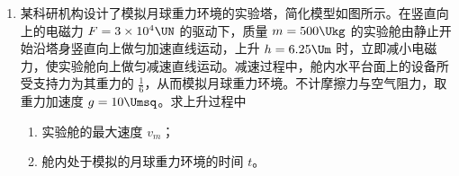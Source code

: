 \documentclass[\gkver]{gaokaozhenti}
\begin{document}
\begin{enumerate}
{（3）根据题图可知测量值明显偏离拟合直线，电容的测量值偏小，根据 $C=\frac{\varepsilon_{r}S}{4\pi kd}$ 可知出现的原因是塑料板没有压紧或正对面积取值偏大。

（4）根据平行板电容公式 $C=\frac{\varepsilon_{r}S}{4\pi kd}$。

对 $C-\frac{d_{0}}{d}$ 图线有
\[ C=\frac{\varepsilon_{\mathrm{r}}S_{0}}{4\pi kd}=\frac{\varepsilon_{\mathrm{r}}S_{0}}{4\pi kd_{0}}\cdot\frac{d_{0}}{d} \]
对 $C-\frac{S}{S_{0}}$ 图线有
\[ C=\frac{\varepsilon_{\mathrm{r}}S}{4\pi k\cdot20d_{0}}=\frac{\varepsilon_{\mathrm{r}}S_{0}}{4\pi k\cdot20d_{0}}\cdot\frac{S}{S_{0}} \]
则 $k_{1}=\frac{\varepsilon_{\mathrm{r}}S_{0}}{4\pi kd_{0}}$，$k_{2}=\frac{\varepsilon_{\mathrm{r}}S_{0}}{4\pi k\cdot20d_{0}}$，可得 $\frac{k_{1}}{k_{2}}=20$。
}
\item
某科研机构设计了模拟月球重力环境的实验塔，简化模型如图所示。在竖直向上的电磁力 $F=3\times10^{4}\UN$ 的驱动下，质量 $m=500\Ukg$ 的实验舱由静止开始沿塔身竖直向上做匀加速直线运动，上升 $h=6.25\Um$ 时，立即减小电磁力，使实验舱向上做匀减速直线运动。减速过程中，舱内水平台面上的设备所受支持力为其重力的 $\frac{1}{6}$，从而模拟月球重力环境。不计摩擦力与空气阻力，取重力加速度 $g=10\Umsq$。求上升过程中
\begin{enumerate}
	\item
	实验舱的最大速度 $v_{m}$；
	\item
	舱内处于模拟的月球重力环境的时间 $t$。
\end{enumerate}
\onepicture[w=3.0cm, align=right]{}

\end{enumerate}
\end{document}
